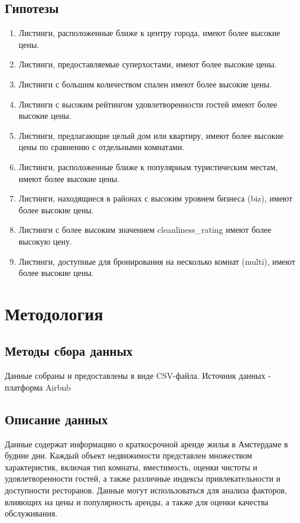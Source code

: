\documentclass[
	11pt
] {article}
\begin{document}
\subsection{Гипотезы}
	\begin{enumerate}
		\item Листинги, расположенные ближе к центру города, имеют более высокие цены.
		\item Листинги, предоставляемые суперхостами, имеют более высокие цены.
		\item Листинги с большим количеством спален имеют более высокие цены.
		\item Листинги с высоким рейтингом удовлетворенности гостей имеют более высокие цены.
		\item Листинги, предлагающие целый дом или квартиру, имеют более высокие цены по сравнению с отдельными комнатами.
		\item Листинги, расположенные ближе к популярным туристическим местам, имеют более высокие цены.
		\item Листинги, находящиеся в районах с высоким уровнем бизнеса (biz), имеют более высокие цены.
		\item Листинги с более высоким значением cleanliness\_rating имеют более высокую цену.
		\item Листинги, доступные для бронирования на несколько комнат (multi), имеют более высокие цены.
	\end{enumerate}

\section{Методология}

\subsection{Методы сбора данных}
	Данные собраны и предоставлены в виде CSV-файла. Источник данных - платформа Airbnb

\subsection{Описание данных}
	Данные содержат информацию о краткосрочной аренде жилья в Амстердаме в будние дни. Каждый объект недвижимости представлен множеством характеристик, включая тип комнаты, вместимость, оценки чистоты и удовлетворенности гостей, а также различные индексы привлекательности и доступности ресторанов. Данные могут использоваться для анализа факторов, влияющих на цены и популярность аренды, а также для оценки качества обслуживания.
\end{document}
